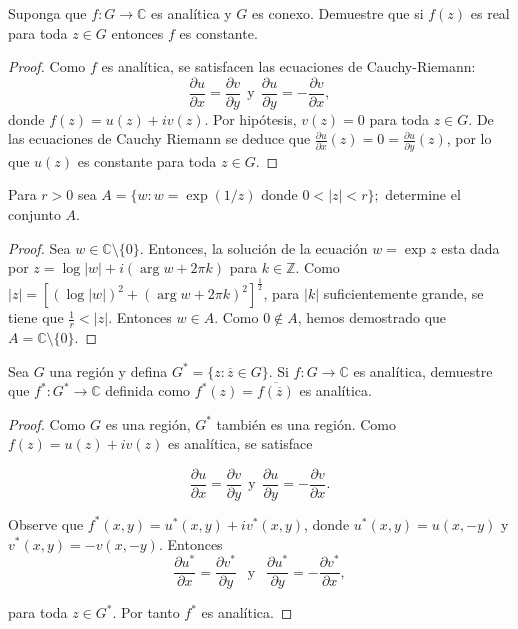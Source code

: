 \documentclass[12pt]{article}
\newcommand{\Z}{\mathbb{Z}}
\newcommand{\C}{\mathbb{C}}
\newenvironment{problem}[2][Problema]{\begin{trivlist}
\item[\hskip \labelsep {\bfseries #1}\hskip \labelsep {\bfseries #2.}]}{\end{trivlist}}
\begin{document}
\begin{problem}{14 pp. 44}
Suponga que $f: G \to \C$ es analítica y $G$ es conexo. Demuestre que si $f(z)$ es real para toda $z \in G$ entonces $f$ es constante. 
\end{problem}
\begin{proof}
Como $f$ es analítica, se satisfacen las ecuaciones de Cauchy-Riemann:
$$
\frac{\partial u}{ \partial x} = \frac{\partial v}{\partial y} \ \ \text{y} \ \ \frac{\partial u}{\partial y} =  - \frac{\partial v}{\partial x},
$$
donde $f(z) = u(z) + i v(z).$ Por hipótesis, $v(z) = 0$ para toda $z \in G.$ De las ecuaciones de Cauchy Riemann se deduce que $\frac{\partial u}{ \partial x}(z) = 0 = \frac{\partial u}{\partial y}(z)$, por lo que $u(z)$ es constante para toda $z \in G.$
\end{proof}

\begin{problem}{15 pp. 44}
Para $r > 0$ sea $A = \{w: w = \exp(1/z) \text{ donde } 0 < \lvert z \rvert < r \};$ determine el conjunto $A$.
\end{problem}
\begin{proof}
Sea $w \in \C \setminus \{0\}$. Entonces, la solución de la ecuación $w = \exp{z}$ esta dada por $z = \log\lvert w \rvert + i(\arg w + 2 \pi k)$ para $k \in \Z.$ Como $\lvert z \lvert =[ (\log \lvert w \lvert )^2 + (\arg w + 2\pi k)^2]^{\frac{1}{2}}$, para $\lvert k \rvert$ suficientemente grande, se tiene que $\frac{1}{r} < \lvert z \rvert$. Entonces $w \in A.$ Como $0 \notin A$, hemos demostrado que $A = \C \setminus \{0\}.$
 

\end{proof}

\begin{problem}{19 pp. 44}
Sea $G$ una región y defina $G^\ast = \{z: \overline z \in G\}$. Si $f: G \to \C$ es analítica, demuestre que $f^\ast: G^\ast \to \C$ definida como $f^\ast(z) = \overline{ f(\overline z)}$ es analítica. 
\end{problem}
\begin{proof}
Como $G$ es una región, $G^\ast$ también es una región. Como $f(z) = u(z) + iv(z)$ es analítica, se satisface 

$$
\frac{\partial u}{ \partial x} = \frac{\partial v}{\partial y} \ \ \text{y} \ \ \frac{\partial u}{\partial y} =  - \frac{\partial v}{\partial x}.
$$

Observe que $f^\ast(x, y) = u^\ast(x, y) + i v^\ast(x, y)$, donde $u^\ast(x,y) = u(x, -y)$ y $v^\ast(x, y) = -v(x, -y).$ Entonces 
$$
\frac{\partial u^\ast}{\partial x}  = \frac{\partial v^\ast}{\partial y} \ \ \text{ y } \ \ 
\frac{\partial u^\ast}{\partial y} = - \frac{\partial v^\ast}{\partial x},
$$

para toda $z \in G^\ast$. Por tanto $f^\ast$ es analítica. 

\end{proof}
\end{document}

